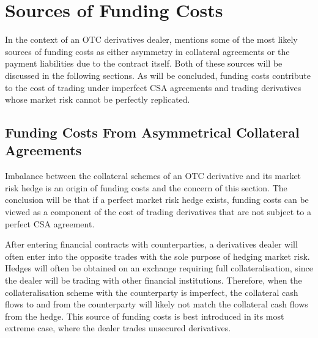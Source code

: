 \documentclass[main.tex]{subfiles}
\begin{document}
    \section{Sources of Funding Costs}
        In the context of an OTC derivatives dealer, 
        \textcite{Ruiz2013FVA} mentions some of the most likely sources of funding costs as
        either asymmetry in collateral agreements or the payment liabilities due to the contract itself.
        Both of these sources will be discussed in the following sections.
        As will be concluded, funding costs contribute to the cost of trading under imperfect CSA agreements 
        and trading derivatives whose market risk cannot be perfectly replicated.

    \subsection{Funding Costs From Asymmetrical Collateral Agreements}
    \label{sec:funding-asymmetric-collateral}
        Imbalance between the collateral schemes of an OTC derivative and its market risk hedge
        is an origin of funding costs and the concern of this section.
        The conclusion will be that if a perfect market risk hedge exists, funding costs can be viewed 
        as a component of the cost of trading derivatives that are not subject to a perfect CSA agreement.

        After entering financial contracts with counterparties,
        a derivatives dealer will often enter into the opposite trades
        with the sole purpose of hedging market risk.
        Hedges will often be obtained on an exchange requiring full collateralisation,
        since the dealer will be trading with other financial institutions.
        Therefore, when the collateralisation scheme with the counterparty is imperfect, 
        the collateral cash flows to and from the counterparty will likely not match the collateral cash flows from the hedge.
        This source of funding costs is best introduced in its most extreme case, 
        where the dealer trades unsecured derivatives. 
\end{document}

